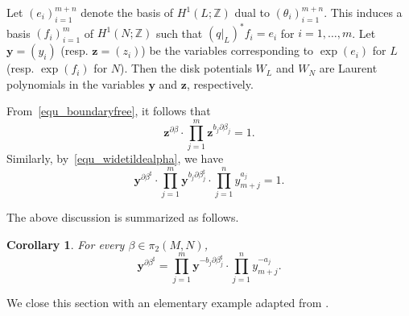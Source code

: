 \documentclass[11pt]{amsart}
\theoremstyle{plain}
\newtheorem{corollary}[theorem]{Corollary}
\theoremstyle{definition}
\theoremstyle{remark}
\newcommand{\Z}{\mathbb{Z}}
\numberwithin{equation}{section} \numberwithin{table}{section}
\numberwithin{equation}{section}
\begin{document}
Let $(e_i)_{i=1}^{m+n}$ denote the basis of $H^1(L; \Z)$ dual to $(\theta_i)_{i=1}^{m+n}$. This induces a basis $(f_i)_{i=1}^m$ of $H^1(N ; \Z)$ such that $(q |_L)^* f_i = e_i$ for $i = 1, \dots, m$. Let $\mathbf{y} = (y_i)$ (resp. $\mathbf{z} = (z_i)$) be the variables corresponding to $\exp(e_i)$ for $L$ (resp. $\exp(f_i)$ for $N$). Then the disk potentials $W_L$ and $W_N$ are Laurent polynomials in the variables $\mathbf{y}$ and $\mathbf{z}$, respectively.

From~\eqref{equ_boundaryfree}, it follows that 
$$
\mathbf{z}^{\partial \beta}  \cdot \prod_{j=1}^m \mathbf{z}^{b_j \partial \beta_j}= 1.
$$
Similarly, by~\eqref{equ_widetildealpha}, we have
$$
\mathbf{y}^{\partial \beta^\sharp} \cdot \prod_{j=1}^m \mathbf{y}^{b_j \partial \beta_j^\sharp} \cdot \prod_{j=1}^n y_{m+j}^{a_j} = 1.
$$

The above discussion is summarized as follows.

\begin{corollary}
For every $\beta \in \pi_2(M,N)$,
$$
\mathbf{y}^{\partial \beta^\sharp}  = \prod_{j=1}^m \mathbf{y}^{- b_j\partial \beta_j^\sharp} \cdot \prod_{j=1}^n y_{m+j}^{- a_j}.
$$
\end{corollary}

We close this section with an elementary example adapted from \cite{Kim26}.
\end{document}
